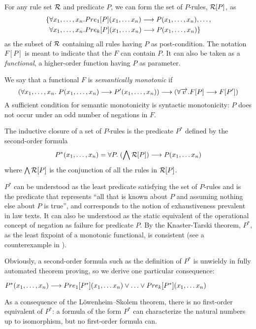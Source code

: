 For any rule set $\cal R$ and predicate $P$, we can form the set of
$P$-rules, ${\cal R}[P]$, as
\begin{align*}
\{ & \forall x_1, \dots, x_n. Pre_1[P](x_1, \dots x_n) \longrightarrow P(x_1, \dots, x_n),
     \dots,\\
  & \forall x_1, \dots, x_n.Pre_k[P](x_1, \dots x_n)\longrightarrow P(x_1, \dots,
x_n)\}
\end{align*}
as the subset of $\cal R$ containing all rules having $P$ as
post-condition. The notation $F[P]$ is meant to indicate that the $F$ can
contain $P$. It can also be taken as a \emph{functional}, \ie{} a higher-order
function having $P$ as parameter.

We say that a functional $F$ is \emph{semantically monotonic} if
\[
  (\forall x_1, \dots, x_n.\; P(x_1, \dots, x_n) \longrightarrow P'(x_1, \dots, x_n)) \longrightarrow 
  (\forall \overrightarrow{v}. F[P] \longrightarrow F[P'])
\]
A sufficient condition for semantic monotonicity is syntactic monotonicity:
$P$ does not occur under an odd number of negations in $F$. 

The inductive closure of a set of $P$-rules is the predicate $P^*$ defined by
the second-order formula
\[  P^*(x_1, \dots, x_n) = \forall P.\; (\bigwedge{\cal R}[P]) \IMPL P(x_1, \dots x_n) \]
where $\bigwedge{\cal R}[P]$ is the conjunction of all the rules in ${\cal R}[P]$.

$P^*$ can be understood as the least predicate satisfying the set of $P$-rules
and is the predicate that represents ``all that is known about $P$ and
assuming nothing else about $P$ is true'', and corresponds to the notion of
exhaustiveness prevalent in law texts. It can also be understood as the static
equivalent of the operational concept of negation as failure for predicate
$P$.  By the Knaster-Tarski theorem, $P^*$, as the least fixpoint of a
monotonic functional, is consistent (see a counterexample in
). 

Obviously, a second-order formula such as the definition of $P^*$ is unwieldy
in fully automated theorem proving, so we derive one particular consequence:

\begin{proposition}\label{lemma:p_star}
$P^*(x_1, \dots, x_n) \IMPL Pre_1[P^*](x_1, \dots x_n) \OR \dots \OR Pre_k[P^*](x_1, \dots x_n)$
\end{proposition}
As a consequence of the Löwenheim–Skolem theorem, there is no first-order
equivalent of $P^*$: a formula of the form $P^*$ can characterize the natural
numbers up to isomorphism, but no first-order formula can.

